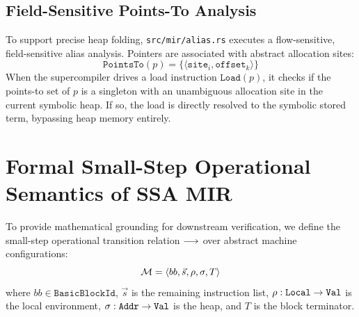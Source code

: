 \subsection{Field-Sensitive Points-To Analysis}
To support precise heap folding, \texttt{src/mir/alias.rs} executes a flow-sensitive, field-sensitive alias analysis. Pointers are associated with abstract allocation sites:
\begin{equation}
\mathtt{PointsTo}(p) = \{ \langle \mathtt{site}_i, \mathtt{offset}_k \rangle \}
\end{equation}
When the supercompiler drives a load instruction $\mathtt{Load}(p)$, it checks if the points-to set of $p$ is a singleton with an unambiguous allocation site in the current symbolic heap. If so, the load is directly resolved to the symbolic stored term, bypassing heap memory entirely.

\section{Formal Small-Step Operational Semantics of SSA MIR}
\label{sec:ir:small_step}

To provide mathematical grounding for downstream verification, we define the small-step operational transition relation $\longrightarrow$ over abstract machine configurations:
\begin{equation}
\mathcal{M} = \langle bb, \vec{s}, \rho, \sigma, T \rangle
\end{equation}
where $bb \in \mathtt{BasicBlockId}$, $\vec{s}$ is the remaining instruction list, $\rho : \mathtt{Local} \to \mathtt{Val}$ is the local environment, $\sigma : \mathtt{Addr} \to \mathtt{Val}$ is the heap, and $T$ is the block terminator.

